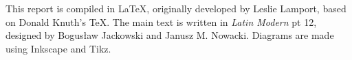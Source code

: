 \noindent This report is compiled in \LaTeX, originally developed by Leslie Lamport, based on Donald Knuth's \TeX. The main text is written in \emph{Latin Modern} pt 12, designed by Bogusław Jackowski and Janusz M. Nowacki. 
Diagrams are made using Inkscape and Tikz.%
\clearpage